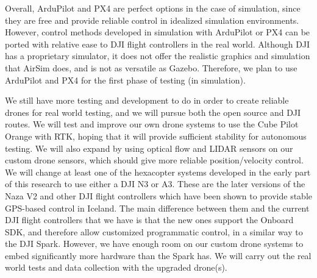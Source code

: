 Overall, ArduPilot and PX4 are perfect options in the case of simulation,
since they are free and provide reliable control in idealized simulation environments.
However, control methods developed in simulation with ArduPilot or PX4 can be ported with relative ease to DJI flight controllers in the real world.
Although DJI has a proprietary simulator, it does not offer the realistic graphics and simulation that AirSim does,
and is not as versatile as Gazebo.
Therefore, we plan to use ArduPilot and PX4 for the first phase of testing (in simulation).

We still have more testing and development to do in order to create reliable drones for real world testing,
and we will pursue both the open source and DJI routes.
We will test and improve our own drone systems to use the Cube Pilot Orange with RTK,
hoping that it will provide sufficient stability for autonomous testing.
We will also expand by using optical flow and LIDAR sensors on our custom drone sensors,
which should give more reliable position/velocity control.
We will change at least one of the hexacopter systems developed in the early part of this research to use either a
DJI N3 or A3.
These are the later versions of the Naza V2 and other DJI flight controllers which have been shown to provide stable
GPS-based control in Iceland.
The main difference between them and the current DJI flight controllers that we have is that the new ones support the
Onboard SDK, and therefore allow customized programmatic control, in a similar way to the DJI Spark.
However, we have enough room on our custom drone systems to embed significantly more hardware than the Spark has.
We will carry out the real world tests and data collection with the upgraded drone(s).